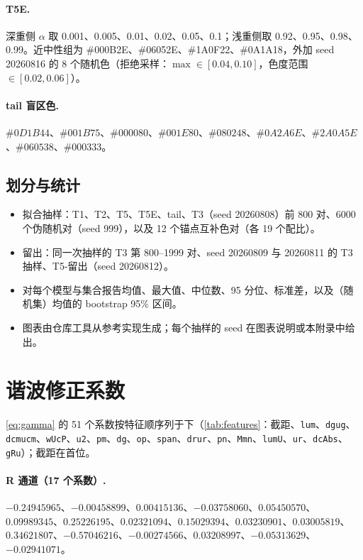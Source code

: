 \paragraph{T5E.}
深重侧 $\alpha$ 取 0.001、0.005、0.01、0.02、0.05、0.1；浅重侧取 0.92、0.95、0.98、0.99。近中性组为 \#000B2E、\#06052E、\#1A0F22、\#0A1A18，外加 seed 20260816 的 8 个随机色（拒绝采样：$\max\in[0.04,0.10]$，色度范围 $\in[0.02,0.06]$）。

\paragraph{tail 盲区色.}
$\#0D1B44$、$\#001B75$、$\#000080$、$\#001E80$、$\#080248$、$\#0A2A6E$、$\#2A0A5E$、$\#060538$、$\#000333$。

\subsection{划分与统计}
\begin{itemize}
\item 拟合抽样：T1、T2、T5、T5E、tail、T3（seed 20260808）前 800 对、6000 个伪随机对（seed 999），以及 12 个锚点互补色对（各 19 个配比）。
\item 留出：同一次抽样的 T3 第 800--1999 对、seed 20260809 与 20260811 的 T3 抽样、T5-留出（seed 20260812）。
\item 对每个模型与集合报告均值、最大值、中位数、95 分位、标准差，以及（随机集）均值的 bootstrap 95\% 区间。
\item 图表由仓库工具从参考实现生成；每个抽样的 seed 在图表说明或本附录中给出。
\end{itemize}

\section{谐波修正系数}
\label{app:coeff}

\cref{eq:gamma} 的 51 个系数按特征顺序列于下（\cref{tab:features}：截距、\texttt{lum}、\texttt{dgug}、\texttt{dcmucm}、\texttt{wUcP}、\texttt{u2}、\texttt{pm}、\texttt{dg}、\texttt{op}、\texttt{span}、\texttt{drur}、\texttt{pn}、\texttt{Mmn}、\texttt{lumU}、\texttt{ur}、\texttt{dcAbs}、\texttt{gRu}）；截距在首位。

\paragraph{R 通道（17 个系数）.}
$-0.24945965$、$-0.00458899$、$0.00415136$、$-0.03758060$、$0.05450570$、$0.09989345$、$0.25226195$、$0.02321094$、$0.15029394$、$0.03230901$、$0.03005819$、$0.34621807$、$-0.57046216$、$-0.00274566$、$0.03208997$、$-0.05313629$、$-0.02941071$。

